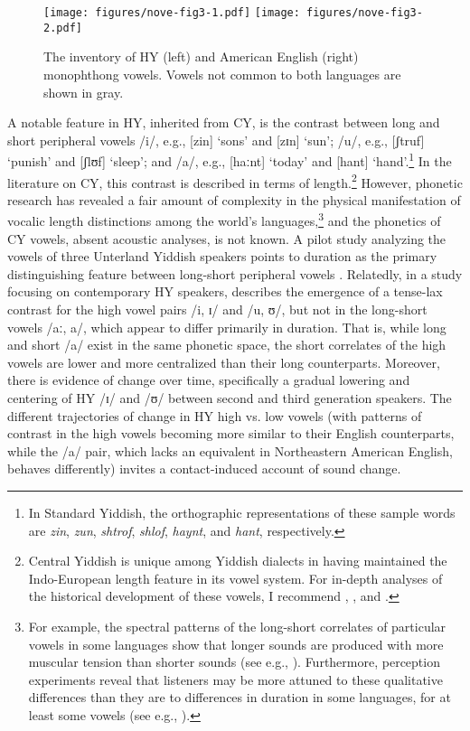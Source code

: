 \documentclass[output=paper]{langsci/langscibook}
\begin{document}
\begin{figure}
\texttt{[image: figures/nove-fig3-1.pdf]}\hfill
\texttt{[image: figures/nove-fig3-2.pdf]}
\caption{The inventory of HY (left) and American English (right) monophthong vowels. Vowels not common to both languages are shown in gray.\label{fig:nove:3}} 
\end{figure}

A notable feature in HY, inherited from CY, is the contrast between long and short peripheral vowels /i/, e.g., [zin] ‘sons’ and [zɪn] ‘sun’; /u/, e.g., [ʃtruf] ‘punish’ and [ʃlʊf] ‘sleep’; and /a/, e.g., [haːnt] ‘today’ and [hant] ‘hand’.\footnote{In Standard Yiddish, the orthographic representations of these sample words are \textit{zin}, \textit{zun}, \textit{shtrof}, \textit{shlof}, \textit{haynt}, and \textit{hant}, respectively.} In the literature on CY, this contrast is described in terms of length.\footnote{Central Yiddish is unique among Yiddish dialects in having maintained the Indo-European length feature in its vowel system. For in-depth analyses of the historical development of these vowels, I recommend \citet{Beider2015}, \citet{Herzog1964}, and \citet{Jacobs1990}.} However, phonetic research has revealed a fair amount of complexity in the physical manifestation of vocalic length distinctions among the world’s languages,\footnote{For example, the spectral patterns of the long-short correlates of particular vowels in some languages show that longer sounds are produced with more muscular tension than shorter sounds (see e.g., \citealt{AbramsonRen1990}). Furthermore, perception experiments reveal that listeners may be more attuned to these qualitative differences than they are to differences in duration in some languages, for at least some vowels (see e.g., \citealt{AbramsonRen1990, Lehiste1970, PetersonLehiste1960}).} and the phonetics of CY vowels, absent acoustic analyses, is not known. A pilot study analyzing the vowels of three Unterland Yiddish speakers points to duration as the primary distinguishing feature between long-short peripheral vowels \citep{Nove2020}. Relatedly, in a study focusing on contemporary HY speakers, \citet{Nove2018b} describes the emergence of a tense-lax contrast for the high vowel pairs /i, ɪ/ and /u, ʊ/, but not in the long-short vowels /aː, a/, which appear to differ primarily in duration. That is, while long and short /a/ exist in the same phonetic space, the short correlates of the high vowels are lower and more centralized than their long counterparts. Moreover, there is evidence of change over time, specifically a gradual lowering and centering of HY /ɪ/ and /ʊ/ between second and third generation speakers. The different trajectories of change in HY high vs. low vowels (with patterns of contrast in the high vowels becoming more similar to their English counterparts, while the /a/ pair, which lacks an equivalent in Northeastern American English, behaves differently) invites a contact-induced account of sound change.
\end{document}
